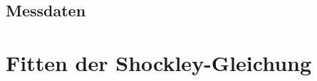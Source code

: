 \clearpage
\subsection{Messdaten}

















\clearpage
\section{Fitten der Shockley-Gleichung}

